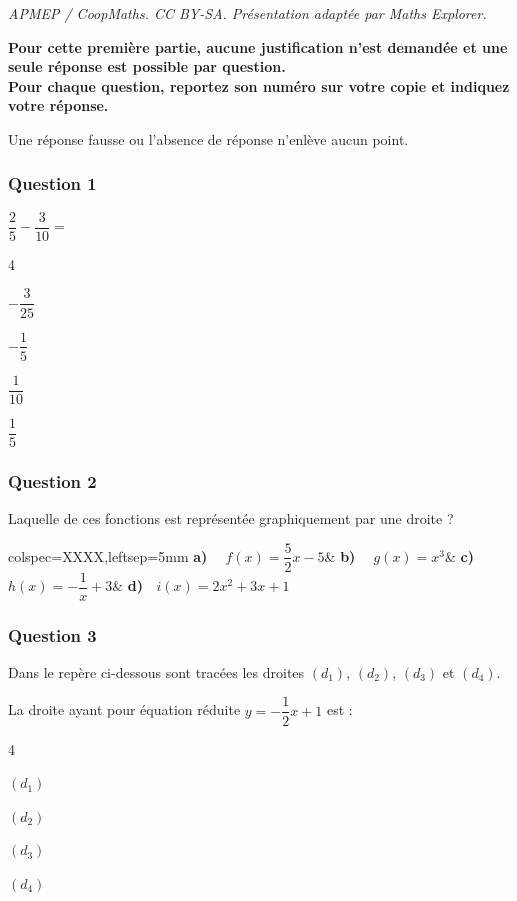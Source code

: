 \documentclass[10pt]{article}
\begin{document}
\noindent\textit{APMEP / CoopMaths. CC BY-SA. Présentation adaptée par Maths Explorer.}\par\medskip
\textbf{Pour cette première partie, aucune justification n'est demandée et une seule réponse est possible par question.\\
	Pour chaque question, reportez son numéro sur votre copie et indiquez votre réponse.}

	Une réponse fausse ou l'absence de réponse n'enlève aucun point.

\subsubsection*{Question 1}
\mbox{$\dfrac25-\dfrac{3}{10}=$}
		\begin{enumerate}[label=\textbf{\alph*)}]
\begin{multicols}{4}
			\item \mbox{$-\dfrac{3}{25}$}
			\item \mbox{$-\dfrac15$}
			\item \mbox{$\dfrac{1}{10}$}
			\item \mbox{$\dfrac15$}
				\end{multicols}
		\end{enumerate}

		\subsubsection*{Question 2}

Laquelle de ces fonctions est représentée graphiquement par une droite ?

		\begin{tblr}{colspec={XXXX},leftsep=5mm}
			\textbf{a) ~} \mbox{$f(x)=\dfrac52 x-5$}&
			\textbf{b) ~} \mbox{$g(x)=x^3$}&
			\textbf{c) ~} \mbox{$h(x)=-\dfrac1 x +3$}&
			\textbf{d) ~}\mbox{$i(x)=2x^2+3x+1$}
		\end{tblr}

\subsubsection*{Question 3}
	Dans le repère ci-dessous sont tracées les droites $(d_1)$, $(d_2)$, $(d_3)$ et $(d_4)$.

	La droite ayant pour équation réduite \quad\mbox{$y=-\dfrac12 x +1$} \quad est :
	\begin{enumerate}[label=\textbf{\alph*)}]
		\begin{multicols}{4}
			\item $(d_1)$
			\item $(d_2)$
			\item $(d_3)$
			\item $(d_4)$
		\end{multicols}
	\end{enumerate}
\end{document}
